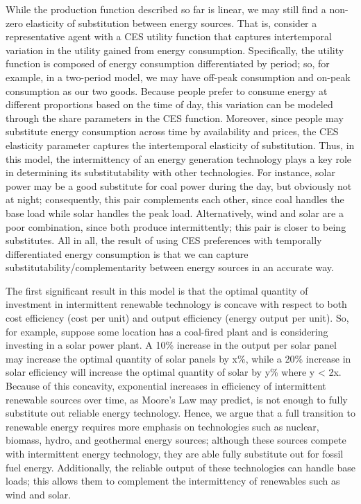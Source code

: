 \documentclass[12pt,a4paper]{extarticle}
\begin{document}
While the production function described so far is linear, we may still find a non-zero elasticity of substitution between energy sources. That is, consider a representative agent with a CES utility function that captures intertemporal variation in the utility gained from energy consumption. Specifically, the utility function is composed of energy consumption differentiated by period; so, for example, in a two-period model, we may have off-peak consumption and on-peak consumption as our two goods. Because people prefer to consume energy at different proportions based on the time of day, this variation can be modeled through the share parameters in the CES function. Moreover, since people may substitute energy consumption across time by availability and prices, the CES elasticity parameter captures the intertemporal elasticity of substitution. Thus, in this model, the intermittency of an energy generation technology plays a key role in determining its substitutability with other technologies. For instance, solar power may be a good substitute for coal power during the day, but obviously not at night; consequently, this pair complements each other, since coal handles the base load while solar handles the peak load. Alternatively, wind and solar are a poor combination, since both produce intermittently; this pair is closer to being substitutes. All in all, the result of using CES preferences with temporally differentiated energy consumption is that we can capture substitutability/complementarity between energy sources in an accurate way. 

The first significant result in this model is that the optimal quantity of investment in intermittent renewable technology is concave with respect to both cost efficiency (cost per unit) and output efficiency (energy output per unit). So, for example, suppose some location has a coal-fired plant and is considering investing in a solar power plant. A 10\% increase in the output per solar panel may increase the optimal quantity of solar panels by x\%, while a 20\% increase in solar efficiency will increase the optimal quantity of solar by y\% where y < 2x. Because of this concavity, exponential increases in efficiency of intermittent renewable sources over time, as Moore’s Law may predict, is not enough to fully substitute out reliable energy technology. Hence, we argue that a full transition to renewable energy requires more emphasis on technologies such as nuclear, biomass, hydro, and geothermal energy sources; although these sources compete with intermittent energy technology, they are able fully substitute out for fossil fuel energy. Additionally, the reliable output of these technologies can handle base loads; this allows them to complement the intermittency of renewables such as wind and solar. 
\end{document}
